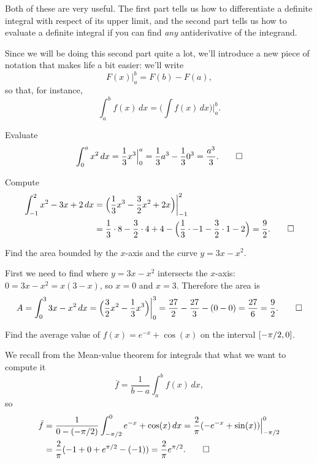 \noindent
Both of these are very useful.
The first part tells us how to differentiate a definite integral with respect of its upper limit, and the second part tells us how to evaluate a definite integral if you can find \emph{any} antiderivative of the integrand.

Since we will be doing this second part quite a lot, we'll introduce a new piece of notation that makes life a bit easier: we'll write
\[
	F(x) \Big \rvert_a^b = F(b) - F(a),
\]
so that, for instance,
\[
	\int_a^b f(x) \, d x = \Big ( \int f(x) \, d x \Big ) \biggr \rvert_a^b.
\]

\begin{example}
	Evaluate
	\[
		\int_0^a x^2 \, d x = \frac{1}{3} x^3 \Big \rvert_0^a = \frac{1}{3} a^3 - \frac{1}{3} 0^3 = \frac{a^3}{3}. \qedhere
	\]
\end{example}

\begin{example}
	Compute
	\begin{align*}
		\int_{-1}^2 x^2 - 3 x + 2 \, d x & = \Big ( \frac{1}{3} x^3 - \frac{3}{2} x^2 + 2 x \Big ) \biggr \rvert_{-1}^2                                                           \\
		                                 & = \frac{1}{3} \cdot 8 - \frac{3}{2} \cdot 4 + 4 - \Big ( \frac{1}{3} \cdot -1 - \frac{3}{2} \cdot 1 - 2 \Big ) = \frac{9}{2}. \qedhere
	\end{align*}
\end{example}

\begin{example}
	Find the area bounded by the $x$-axis and the curve $y = 3x - x^2$.

	First we need to find where $y = 3x - x^2$ intersects the $x$-axis: $0 = 3 x - x^2 = x (3 - x)$, so $x = 0$ and $x = 3$.
	Therefore the area is
	\[
		A = \int_0^3 3 x - x^2 \, d x = \Big ( \frac{3}{2} x^2 - \frac{1}{3} x^3 \Big ) \biggr \rvert_0^3 = \frac{27}{2} - \frac{27}{3} - (0 - 0) = \frac{27}{6} = \frac{9}{2}. \qedhere
	\]
\end{example}

\begin{example}
	Find the average value of $f(x) = e^{-x} + \cos(x)$ on the interval $\interval{-\pi/2}{0}$.

	We recall from the Mean-value theorem for integrals that what we want to compute it
	\[
		\bar{f} = \frac{1}{b - a} \int_a^b f(x) \, d x,
	\]
	so
	\begin{align*}
		\bar{f} & = \frac{1}{0 - (- \pi/2)} \int_{-\pi/2}^0 e^{-x} + \cos(x) \, d x = \frac{2}{\pi} (-e^{-x} + \sin(x)) \Big \rvert_{-\pi/2}^0 \\
		        & = \frac{2}{\pi} (-1 + 0 + e^{\pi/2} - (-1)) = \frac{2}{\pi} e^{\pi/2}. \qedhere
	\end{align*}
\end{example}

